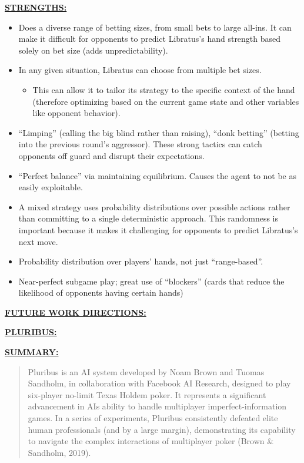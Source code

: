 \documentclass[
]{article}
\begin{document}
\textbf{\ul{STRENGTHS:}}

\begin{itemize}
\item
  Does a diverse range of betting sizes, from small bets to large
  all-ins. It can make it difficult for opponents to predict Libratus's
  hand strength based solely on bet size (adds unpredictability).
\item
  In any given situation, Libratus can choose from multiple bet sizes.

  \begin{itemize}
  \item
    This can allow it to tailor its strategy to the specific context of
    the hand (therefore optimizing based on the current game state and
    other variables like opponent behavior).
  \end{itemize}
\item
  ``Limping'' (calling the big blind rather than raising), ``donk
  betting'' (betting into the previous round's aggressor). These strong
  tactics can catch opponents off guard and disrupt their expectations.
\item
  ``Perfect balance'' via maintaining equilibrium. Causes the agent to
  not be as easily exploitable.
\item
  A mixed strategy uses probability distributions over possible actions
  rather than committing to a single deterministic approach. This
  randomness is important because it makes it challenging for opponents
  to predict Libratus's next move.
\item
  Probability distribution over players' hands, not just
  ``range-based''.
\item
  Near-perfect subgame play; great use of ``blockers'' (cards that
  reduce the likelihood of opponents having certain hands)
\end{itemize}

\textbf{\ul{FUTURE WORK DIRECTIONS:}}

\textbf{\ul{PLURIBUS:}}

\textbf{\ul{SUMMARY:}}

\begin{quote}
Pluribus is an AI system developed by Noam Brown and Tuomas Sandholm, in
collaboration with Facebook AI Research, designed to play six-player
no-limit Texas Hold\textquotesingle em poker. It represents a
significant advancement in AI\textquotesingle s ability to handle
multiplayer imperfect-information games. In a series of experiments,
Pluribus consistently defeated elite human professionals (and by a large
margin), demonstrating its capability to navigate the complex
interactions of multiplayer poker (Brown \& Sandholm, 2019).
\end{quote}
\end{document}
